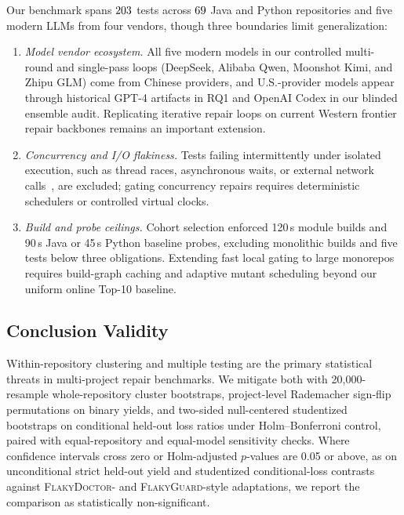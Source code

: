Our benchmark spans $203$ tests across $69$ Java and Python repositories and five modern LLMs from four vendors, though three boundaries limit generalization:
\begin{enumerate}[nosep]
    \item \emph{Model vendor ecosystem.} All five modern models in our controlled multi-round and single-pass loops (DeepSeek, Alibaba Qwen, Moonshot Kimi, and Zhipu GLM) come from Chinese providers, and U.S.-provider models appear through historical GPT-4 artifacts in RQ1 and OpenAI Codex in our blinded ensemble audit. Replicating iterative repair loops on current Western frontier repair backbones remains an important extension.
    \item \emph{Concurrency and I/O flakiness.} Tests failing intermittently under isolated execution, such as thread races, asynchronous waits, or external network calls~\cite{rahman2024flakesync,rahman2026tdrepro,foster2026flakefighters}, are excluded; gating concurrency repairs requires deterministic schedulers or controlled virtual clocks.
    \item \emph{Build and probe ceilings.} Cohort selection enforced 120\,s module builds and 90\,s Java or 45\,s Python baseline probes, excluding monolithic builds and five tests below three obligations. Extending fast local gating to large monorepos requires build-graph caching and adaptive mutant scheduling beyond our uniform online Top-10 baseline.
\end{enumerate}

\subsection{Conclusion Validity}

Within-repository clustering and multiple testing are the primary statistical threats in multi-project repair benchmarks. We mitigate both with 20,000-resample whole-repository cluster bootstraps, project-level Rademacher sign-flip permutations on binary yields, and two-sided null-centered studentized bootstraps on conditional held-out loss ratios under Holm--Bonferroni control, paired with equal-repository and equal-model sensitivity checks. Where confidence intervals cross zero or Holm-adjusted $p$-values are 0.05 or above, as on unconditional strict held-out yield and studentized conditional-loss contrasts against \textsc{FlakyDoctor}- and \textsc{FlakyGuard}-style adaptations, we report the comparison as statistically non-significant.

